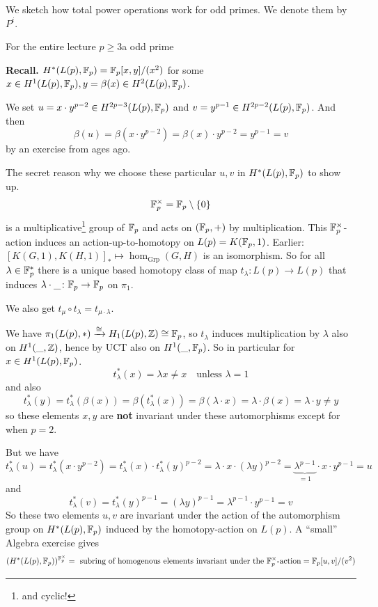 \documentclass[language=english]{TemplateLecture}
\begin{document}

We sketch how total power operations work for odd primes. We denote them by \(P^i\).

For the entire lecture \(p\geq 3\)a odd prime

\textbf{Recall.} \(H^*(L(p), \mathbb{F}_p) = \mathbb{F}_p[x,y]/(x^2)\) for some \(x \in H^1(L(p), \mathbb{F}_p), y = \beta(x)\in H^2(L(p), \mathbb{F}_p)\).

We set \(u = x\cdot y^{p-2}\in H^{2p-3}(L(p), \mathbb{F}_p)\) and \(v = y^{p-1}\in H^{2p-2}(L(p), \mathbb{F}_p)\). And then
\[\beta(u) = \beta(x\cdot y^{p-2}) = \beta(x)\cdot y^{p-2} = y^{p-1} = v\]
by an exercise from ages ago.

The secret reason why we choose these particular \(u,v\) in \(H^*(L(p),\mathbb{F}_p)\) to show up.
\[\mathbb{F}_p^\times = \mathbb{F}_p\setminus\{0\} \]
is a multiplicative\footnote{and cyclic!} group of \(\mathbb{F}_p\) and acts on \((\mathbb{F}_p, +)\) by multiplication. This \(\mathbb{F}_p^\times\)-action induces an action-up-to-homotopy on \(L(p)= K(\mathbb{F}_p,1)\). Earlier: \([K(G,1), K(H,1)]_*\mapsto \hom_{\mathrm{Grp}}(G,H)\) is an isomorphism. So for all \(\lambda\in \mathbb{F}_p^*\) there is a unique based homotopy class of map \(t_\lambda\colon L(p)\to L(p)\) that induces \(\lambda\cdot\_ \colon \mathbb{F}_p \to \mathbb{F}_p\) on \(\pi_1\).

We also get \(t_\mu \circ t_\lambda = t_{\mu\cdot\lambda}\).

We have \(\pi_1(L(p), *) \xrightarrow{\cong} H_1(L(p), \mathbb{Z}) \cong \mathbb{F}_p\), so \(t_\lambda\) induces multiplication by \(\lambda\) also on \(H^1(\_, \mathbb{Z})\), hence by UCT also on \(H^1(\_, \mathbb{F}_p)\). So in particular for \(x \in H^1(L(p), \mathbb{F}_p)\).
\[t_\lambda^*(x) = \lambda x \neq x \quad \text{unless } \lambda = 1\]
and also
\[t_\lambda^*(y) = t_\lambda^*(\beta(x)) = \beta(t_\lambda^*(x)) = \beta(\lambda \cdot x) = \lambda \cdot\beta(x) = \lambda \cdot y \neq y\]
so these elements \(x,y\) are \textbf{not} invariant under these automorphisms except for when \(p = 2\).

But we have
\[t^*_\lambda(u) = t^*_\lambda(x\cdot y^{p-2}) = t_\lambda^*(x)\cdot t_\lambda^*(y)^{p-2}= \lambda \cdot x \cdot (\lambda y)^{p-2} = \underbrace{\lambda^{p-1}}_{= 1} \cdot x\cdot y^{p-1} = u\]
and
\[t_\lambda^*(v) = t_\lambda^*(y)^{p-1} = (\lambda y)^{p-1} = \lambda^{p-1} \cdot y^{p-1} = v\]
So these two elements \(u,v\) are invariant under the action of the automorphism group on \(H^*(L(p), \mathbb{F}_p)\) induced by the homotopy-action on \(L(p)\). A \enquote{small} Algebra exercise gives
\[(H^*(L(p), \mathbb{F}_p))^{\mathbb{F}_p^\times} = \text{ subring of homogenous elements invariant under the \(\mathbb{F}_p^\times\)-action} = \mathbb{F}_p[u,v]/(v^2)\]
\end{document}
